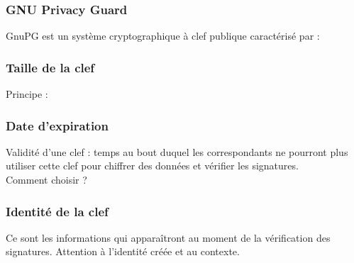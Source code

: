 \documentclass{beamer}
\begin{document}

\begin{frame}
\frametitle{GNU Privacy Guard}
GnuPG est un système cryptographique à clef publique caractérisé par :
\begin{itemize}
\end{itemize}
\end{frame}

\begin{frame}
\frametitle{Taille de la clef}
Principe :
\begin{itemize}
\end{itemize}
\end{frame}


\begin{frame}
\frametitle{Date d’expiration}
Validité d’une clef : temps au bout duquel les correspondants ne pourront plus utiliser cette clef pour chiffrer des données et vérifier les signatures.
\\
Comment choisir ?
\begin{itemize}
\end{itemize}
\end{frame}

\begin{frame}
\frametitle{Identité de la clef}
Ce sont les informations qui apparaîtront au moment de la vérification des signatures. Attention à l’identité créée et au contexte.
\end{frame}
\end{document}
